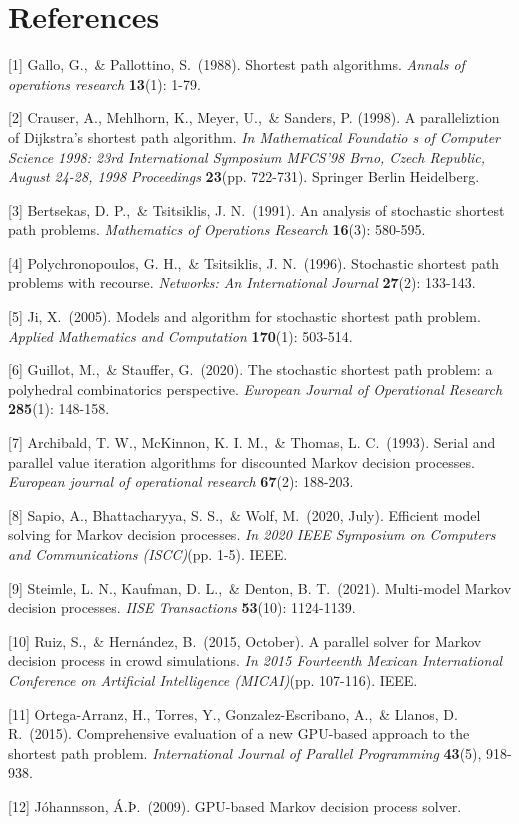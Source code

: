 \documentclass{article}
\begin{document}
\section*{References}
\small

[1] Gallo, G.,\ \& Pallottino, S.\ (1988). Shortest path algorithms. {\it Annals 
  of operations research} {\bf 13}(1): 1-79.

[2] Crauser, A., Mehlhorn, K., Meyer, U.,\ \& Sanders, P. (1998). A paralleliztion 
  of Dijkstra's shortest path algorithm. {\it In Mathematical Foundatio
  s of Computer Science 1998: 23rd International Symposium MFCS'98 Brno, 
  Czech Republic, August 24-28, 1998 Proceedings} {\bf 23}(pp. 722-731). Springer Berlin Heidelberg.

[3] Bertsekas, D. P.,\ \& Tsitsiklis, J. N.\ (1991). An analysis of stochastic shortest path problems. 
  {\it Mathematics of Operations Research} {\bf 16}(3): 580-595.

[4] Polychronopoulos, G. H.,\ \& Tsitsiklis, J. N.\ (1996). Stochastic shortest path problems with 
  recourse. {\it Networks: An International Journal} {\bf 27}(2): 133-143.

[5] Ji, X.\ (2005). Models and algorithm for stochastic shortest path problem. {\it Applied Mathematics 
  and Computation} {\bf 170}(1): 503-514.

[6] Guillot, M.,\ \& Stauffer, G.\ (2020). The stochastic shortest path problem: a polyhedral combinatorics 
  perspective. {\it European Journal of Operational Research} {\bf 285}(1): 148-158.

[7] Archibald, T. W., McKinnon, K. I. M.,\ \& Thomas, L. C.\ (1993). Serial and parallel value iteration 
  algorithms for discounted Markov decision processes. {\it European journal of operational research} {\bf 67}(2): 188-203.

[8] Sapio, A., Bhattacharyya, S. S.,\ \& Wolf, M.\ (2020, July). Efficient model solving for Markov decision processes. 
  {\it In 2020 IEEE Symposium on Computers and Communications (ISCC)}(pp. 1-5). IEEE.

[9] Steimle, L. N., Kaufman, D. L.,\ \& Denton, B. T.\ (2021). Multi-model Markov decision processes. 
  {\it IISE Transactions} {\bf 53}(10): 1124-1139.

[10] Ruiz, S.,\ \& Hernández, B.\ (2015, October). A parallel solver for Markov decision process in crowd simulations. 
  {\it In 2015 Fourteenth Mexican International Conference on Artificial Intelligence (MICAI)}(pp. 107-116). IEEE.

[11] Ortega-Arranz, H., Torres, Y., Gonzalez-Escribano, A.,\ \& Llanos, D. R.\ (2015). Comprehensive evaluation of 
  a new GPU-based approach to the shortest path problem. {\it International Journal of Parallel Programming} {\bf 43}(5), 918-938.

[12] Jóhannsson, Á.Þ.\ (2009). GPU-based Markov decision process solver.
\end{document}
